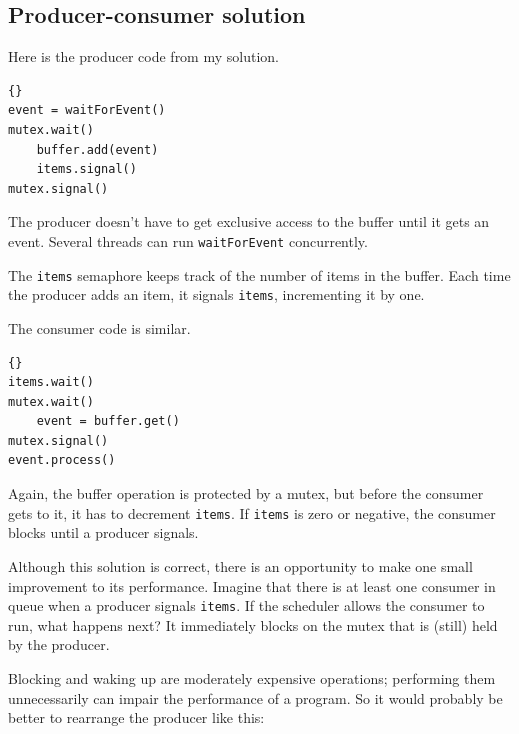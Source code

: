 \documentclass{book}
\newcommand{\clearemptydoublepage}{\newpage\cleardoublepage}
\begin{document}
\clearemptydoublepage
\subsection{Producer-consumer solution}

Here is the producer code from my solution.

\begin{latin}
\begin{latin}
\begin{lstlisting}[title={Producer solution}]{}
event = waitForEvent()
mutex.wait()
    buffer.add(event)
    items.signal()
mutex.signal()
\end{lstlisting}
\end{latin}
\end{latin}

The producer doesn't have to get exclusive access to the buffer
until it gets an event.  Several threads can run {\tt waitForEvent}
concurrently.

The {\tt items} semaphore keeps track of the
number of items in the buffer.  Each time the producer adds an
item, it signals {\tt items}, incrementing it by one.

The consumer code is similar.

\begin{latin}
\begin{latin}
\begin{lstlisting}[title={Consumer solution}]{}
items.wait()
mutex.wait()
    event = buffer.get()
mutex.signal()
event.process()
\end{lstlisting}
\end{latin}
\end{latin}

Again, the buffer operation is protected by a mutex,
but before the consumer gets to it, it has to decrement
{\tt items}.  If {\tt items} is zero or negative, the
consumer blocks until a producer signals.

Although this solution is correct, there is an opportunity
to make one small improvement to its performance.  Imagine
that there is at least one consumer in queue when a producer
signals {\tt items}.  If the scheduler allows the consumer
to run, what happens next?  It immediately blocks on the
mutex that is (still) held by the producer.

Blocking and waking up are moderately expensive operations;
performing them unnecessarily can impair the performance of
a program.  So it would probably be better to rearrange the
producer like this:
\end{document}
